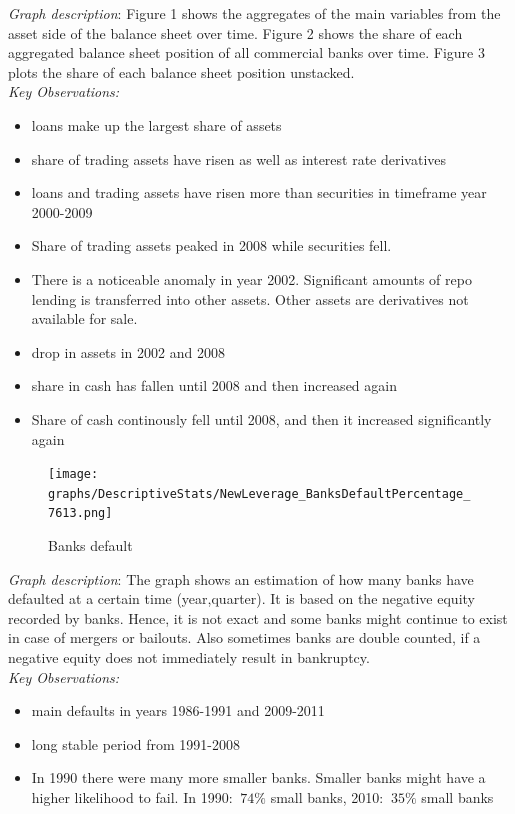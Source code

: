 \documentclass[12pt, a4paper]{article} %
\begin{document}
\noindent \textit{Graph description}: Figure 1 shows the aggregates of the main variables from the asset side of the balance sheet over time. Figure 2 shows the share of each aggregated balance sheet position of all commercial banks over time. Figure 3 plots the share of each balance sheet position unstacked.\\


\noindent \textit{Key Observations:}
\begin{itemize}
\item loans make up the largest share of assets
\item share of trading assets have risen as well as interest rate derivatives
\item loans and trading assets have risen more than securities in timeframe year 2000-2009
\item Share of trading assets peaked in 2008 while securities fell.
\item There is a noticeable anomaly in year 2002. Significant amounts of repo lending is transferred into other assets. Other assets are derivatives not available for sale. 
\item drop in assets in 2002 and 2008
\item share in cash has fallen until 2008 and then increased again
\item Share of cash continously fell until 2008, and then it increased significantly again
\end{itemize}
\fi
\newpage

\iffalse

\begin{figure}[hbtp]
\centering
\caption{Banks default}
\texttt{[image: graphs/DescriptiveStats/NewLeverage\_BanksDefaultPercentage\_7613.png]}
\end{figure}

\noindent \textit{Graph description}: The graph shows an estimation of how many banks have defaulted at a certain time (year,quarter). It is based on the negative equity recorded by banks. Hence, it is not exact and some banks might continue to exist in case of mergers or bailouts. Also sometimes banks are double counted, if a negative equity does not immediately result in bankruptcy. \\
\noindent \textit{Key Observations:}
\begin{itemize}
\item main defaults in years 1986-1991 and 2009-2011
\item long stable period from 1991-2008
\item In 1990 there were many more smaller banks. Smaller banks might have a higher likelihood to fail. In 1990:  $~74\%$ small banks, 2010: $~35\%$ small banks 
\end{itemize}
\end{document}
